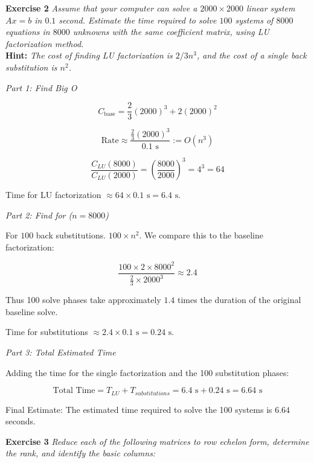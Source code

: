 \documentclass[9pt]{article}
\theoremstyle{plain}
\begin{document}
\noindent \textbf{Exercise 2} \textit{Assume that your computer can solve a $2000 \times 2000$ linear system $Ax = b$ in $0.1$ second. Estimate the time required to solve $100$ systems of $8000$ equations in $8000$ unknowns with the same coefficient matrix, using LU factorization method.} \\
\textbf{Hint:} \textit{The cost of finding LU factorization is $2/3n^3$, and the cost of a single back substitution is $n^2$.} \\ \noindent

\textit{Part 1: Find Big O} 

$$C_{\text{base}} = \frac{2}{3}(2000)^3 + 2(2000)^2$$

$$\text{Rate} \approx \frac{\frac{2}{3}(2000)^3}{0.1 \text{ s}} := O(n^3)$$

$$\frac{C_{LU}(8000)}{C_{LU}(2000)} = \left(\frac{8000}{2000}\right)^3 = 4^3 = 64$$


Time for LU factorization $\approx 64 \times 0.1 \text{ s} = 6.4 \text{ s}$. \\ \noindent 

\textit{Part 2: Find for ($n = 8000$)} \\ \noindent

For $100$ back substitutions. $100 \times n^2$. We compare this to the baseline factorization:


$$\frac{100 \times 2 \times 8000^2}{\frac{2}{3} \times 2000^3} \approx 2.4$$


Thus 100 solve phases take approximately $1.4$ times the duration of the original baseline solve.

Time for substitutions $\approx 2.4 \times 0.1 \text{ s} = 0.24 \text{ s}$. \\ \noindent

\textit{Part 3: Total Estimated Time} \\ \noindent

Adding the time for the single factorization and the 100 substitution phases:

$$\text{Total Time} = T_{LU} + T_{substitutions} = 6.4 \text{ s} + 0.24 \text{ s} = 6.64 \text{ s}$$

\begin{center}
    Final Estimate:
    The estimated time required to solve the 100 systems is $6.64$ seconds.
\end{center}



\vspace{1em}
\noindent \textbf{Exercise 3} \textit{Reduce each of the following matrices to row echelon form, determine the rank, and identify the basic columns:}
\end{document}
